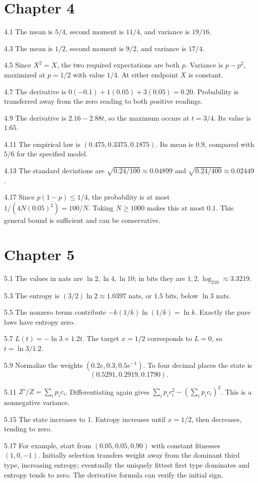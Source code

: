 \documentclass[11pt,oneside,openany]{book}
\theoremstyle{definition}
\theoremstyle{remark}
\newenvironment{answers}{\begin{description}[leftmargin=2.9em,labelwidth=2.5em,labelsep=.4em,itemsep=8pt,font=\normalfont\bfseries]}{\end{description}}
\numberwithin{equation}{chapter}
\begin{document}
\section*{Chapter 4}
\begin{answers}
\item[4.1] The mean is $5/4$, second moment is $11/4$, and variance is $19/16$.
\item[4.3] The mean is $1/2$, second moment is $9/2$, and variance is $17/4$.
\item[4.5] Since $X^2=X$, the two required expectations are both $p$. Variance is $p-p^2$, maximized at $p=1/2$ with value $1/4$. At either endpoint $X$ is constant.
\item[4.7] The derivative is $0(-0.1)+1(0.05)+3(0.05)=0.20$. Probability is transferred away from the zero reading to both positive readings.
\item[4.9] The derivative is $2.16-2.88t$, so the maximum occurs at $t=3/4$. Its value is $1.65$.
\item[4.11] The empirical law is $(0.475,0.3375,0.1875)$. Its mean is $0.9$, compared with $5/6$ for the specified model.
\item[4.13] The standard deviations are $\sqrt{0.24/100}\approx0.04899$ and $\sqrt{0.24/400}\approx0.02449$.
\item[4.17] Since $p(1-p)\leq1/4$, the probability is at most $1/(4N(0.05)^2)=100/N$. Taking $N\geq1000$ makes this at most $0.1$. This general bound is sufficient and can be conservative.
\end{answers}

\section*{Chapter 5}
\begin{answers}
\item[5.1] The values in nats are $\ln2,\ln4,\ln10$; in bits they are $1,2,\log_210\approx3.3219$.
\item[5.3] The entropy is $(3/2)\ln2\approx1.0397$ nats, or $1.5$ bits, below $\ln3$ nats.
\item[5.5] The nonzero terms contribute $-k(1/k)\ln(1/k)=\ln k$. Exactly the pure laws have entropy zero.
\item[5.7] $L(t)=-\ln3+1.2t$. The target $x=1/2$ corresponds to $L=0$, so $t=\ln3/1.2$.
\item[5.9] Normalize the weights $(0.2e,0.3,0.5e^{-1})$. To four decimal places the state is
\[
(0.5291,0.2919,0.1790).
\]
\item[5.11] $Z'/Z=\sum_i p_ic_i$. Differentiating again gives $\sum_i p_ic_i^2-(\sum_i p_ic_i)^2$. This is a nonnegative variance.
\item[5.15] The state increases to 1. Entropy increases until $x=1/2$, then decreases, tending to zero.
\item[5.17] For example, start from $(0.05,0.05,0.90)$ with constant fitnesses $(1,0,-1)$. Initially selection transfers weight away from the dominant third type, increasing entropy; eventually the uniquely fittest first type dominates and entropy tends to zero. The derivative formula can verify the initial sign.
\end{answers}
\end{document}
